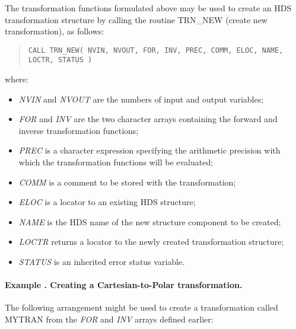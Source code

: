 \documentclass[twoside,11pt]{article}
\newcommand{\name}[1]{\mbox{\small{#1}}}
\newcommand{\fortvar}[1]{\mbox{\emph{#1}}}
\newcounter{examplecounter}
\newcommand{\example}[1]{\addtocounter{examplecounter}{1}
                         \paragraph{\textbf{Example \theexamplecounter. #1}}}
\begin{document}
The transformation functions formulated above may be used to create an
\name{HDS} transformation structure by calling the routine \name{TRN\_NEW}
(create new transformation), as follows: 

\begin{quote}\small
\begin{verbatim}
CALL TRN_NEW( NVIN, NVOUT, FOR, INV, PREC, COMM, ELOC, NAME, LOCTR, STATUS )
\end{verbatim}
\end{quote}

where:

\begin{itemize}

\item \fortvar{NVIN} and \fortvar{NVOUT} are the numbers of input and output
variables; 

\item \fortvar{FOR} and \fortvar{INV} are the two character arrays
containing the forward and inverse transformation functions; 

\item \fortvar{PREC} is a character expression specifying the arithmetic
precision with which the transformation functions will be evaluated; 

\item \fortvar{COMM} is a comment to be stored with the transformation; 

\item \fortvar{ELOC} is a locator to an existing \name{HDS} structure; 

\item \fortvar{NAME} is the \name{HDS} name of the new structure component 
to be created;

\item \fortvar{LOCTR} returns a locator to the newly created transformation 
structure;

\item \fortvar{STATUS} is an inherited error status variable.

\end{itemize}

\example{Creating a Cartesian-to-Polar transformation.}
The following arrangement might be used to create a transformation called
\name{MYTRAN} from the \fortvar{FOR} and \fortvar{INV} arrays defined
earlier: 
\end{document}
